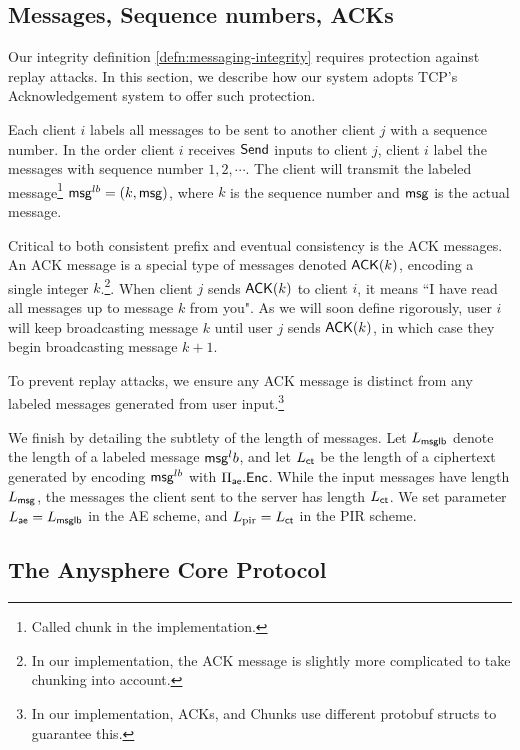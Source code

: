 \subsection{Messages, Sequence numbers, ACKs}
\label{subsec:ACK}
Our integrity definition \cref{defn:messaging-integrity} requires protection against replay attacks. In this section, we describe how our system adopts TCP's Acknowledgement system to offer such protection.

Each client $i$ labels all messages to be sent to another client $j$ with a sequence number. In the order client $i$ receives $\mathsf{Send}$ inputs to client $j$, client $i$ label the messages with sequence number $1,2,\cdots$. The client will transmit the labeled message\footnote{Called chunk in the implementation.} $\mathsf{msg}^{lb} = (k, \mathsf{msg})$, where $k$ is the sequence number and $\mathsf{msg}$ is the actual message. 

Critical to both consistent prefix and eventual consistency is the ACK messages. An ACK message is a special type of messages denoted $\mathsf{ACK}(k)$, encoding a single integer $k$.\footnote{In our implementation, the ACK message is slightly more complicated to take chunking into account.}. When client $j$ sends $\mathsf{ACK}(k)$ to client $i$, it means ``I have read all messages up to message $k$ from you". As we will soon define rigorously, user $i$ will keep broadcasting message $k$ until user $j$ sends $\mathsf{ACK}(k)$, in which case they begin broadcasting message $k + 1$. 

To prevent replay attacks, we ensure any ACK message is distinct from any labeled messages generated from user input.\footnote{In our implementation, ACKs, and Chunks use different protobuf structs to guarantee this.}

We finish by detailing the subtlety of the length of messages. Let $L_{\mathsf{msglb}}$ denote the length of a labeled message $\mathsf{msg}^lb$, and let $L_{\mathsf{ct}}$ be the length of a ciphertext generated by encoding $\mathsf{msg}^{lb}$ with $\Pi_{\mathsf{ae}}.\mathsf{Enc}$. While the input messages have length $L_{\mathsf{msg}}$, the messages the client sent to the server has length $L_{\mathsf{ct}}$. We set parameter $L_{\mathsf{ae}} = L_{\mathsf{msglb}}$ in the AE scheme, and $L_{\text{pir}} = L_{\mathsf{ct}}$ in the PIR scheme.

\subsection{The Anysphere Core Protocol}

